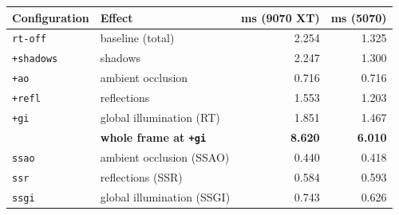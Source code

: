 \begin{tabular}{llrr}
\toprule
Configuration & Effect & ms (9070 XT) & ms (5070) \\
\midrule
\texttt{rt-off}   & baseline (total) & 2.254 & 1.325 \\
\texttt{+shadows} & shadows & 2.247 & 1.300 \\
\texttt{+ao} & ambient occlusion & 0.716 & 0.716 \\
\texttt{+refl} & reflections & 1.553 & 1.203 \\
\texttt{+gi} & global illumination (RT) & 1.851 & 1.467 \\
\midrule
 & \textbf{whole frame at \texttt{+gi}} & \textbf{8.620} & \textbf{6.010} \\
\midrule
\texttt{ssao} & ambient occlusion (SSAO) & 0.440 & 0.418 \\
\texttt{ssr} & reflections (SSR) & 0.584 & 0.593 \\
\texttt{ssgi} & global illumination (SSGI) & 0.743 & 0.626 \\
\bottomrule
\end{tabular}
